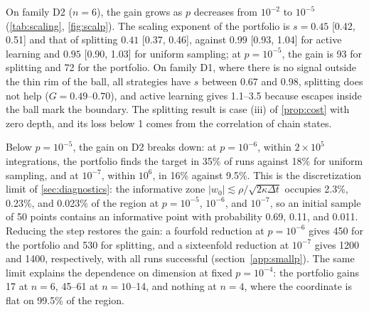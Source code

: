 On family D2 ($n=6$), the gain grows as $p$ decreases from $10^{-2}$ to $10^{-5}$ (\cref{tab:scaling}, \cref{fig:scalp}). The scaling exponent of the portfolio is $s=0.45$ [0.42, 0.51] and that of splitting $0.41$ [0.37, 0.46], against $0.99$ [0.93, 1.04] for active learning and $0.95$ [0.90, 1.03] for uniform sampling; at $p=10^{-5}$, the gain is 93 for splitting and 72 for the portfolio. On family D1, where there is no signal outside the thin rim of the ball, all strategies have $s$ between 0.67 and 0.98, splitting does not help ($G=0.49$--$0.70$), and active learning gives 1.1--3.5 because escapes inside the ball mark the boundary. The splitting result is case (iii) of \cref{prop:cost} with zero depth, and its loss below 1 comes from the correlation of chain states.

Below $p=10^{-5}$, the gain on D2 breaks down: at $p=10^{-6}$, within $2\times10^5$ integrations, the portfolio finds the target in 35\% of runs against 18\% for uniform sampling, and at $10^{-7}$, within $10^6$, in 16\% against 9.5\%. This is the discretization limit of \cref{sec:diagnostics}: the informative zone $|w_0|\lesssim\rho/\sqrt{2\kappa\Delta t}$ occupies 2.3\%, 0.23\%, and 0.023\% of the region at $p=10^{-5}$, $10^{-6}$, and $10^{-7}$, so an initial sample of 50 points contains an informative point with probability 0.69, 0.11, and 0.011. Reducing the step restores the gain: a fourfold reduction at $p=10^{-6}$ gives 450 for the portfolio and 530 for splitting, and a sixteenfold reduction at $10^{-7}$ gives 1200 and 1400, respectively, with all runs successful (section~\ref{app:smallp}). The same limit explains the dependence on dimension at fixed $p=10^{-4}$: the portfolio gains 17 at $n=6$, 45--61 at $n=10$--14, and nothing at $n=4$, where the coordinate is flat on 99.5\% of the region.

